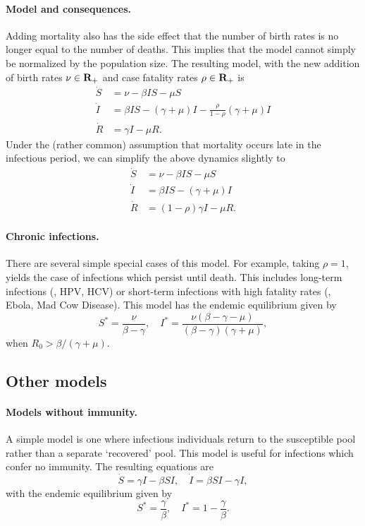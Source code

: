 \documentclass[12pt]{article}
\begin{document}
\paragraph{Model and consequences.} Adding mortality also has the side effect that the number of birth rates is no longer equal to the number of deaths. This implies that the model cannot simply be normalized by the population size. The resulting model, with the new addition of birth rates $\nu \in {\mbox{\bf R}}_+$ and case fatality rates $\rho \in {\mbox{\bf R}}_+$ is
\[
\begin{aligned}
	\dot S &= \nu - \beta IS - \mu S\\
	\dot I &= \beta IS - (\gamma + \mu) I - \frac{\rho}{1 - \rho}(\gamma + \mu) I\\
	\dot R &= \gamma I - \mu R.
\end{aligned}
\]
Under the (rather common) assumption that mortality occurs late in the infectious period, we can simplify the above dynamics slightly to
\[
\begin{aligned}
	\dot S &= \nu - \beta IS - \mu S\\
	\dot I &= \beta IS - (\gamma + \mu) I\\
	\dot R &= (1 - \rho)\gamma I - \mu R.
\end{aligned}
\]

\paragraph{Chronic infections.} There are several simple special cases of this model. For example, taking $\rho = 1$, yields the case of infections which persist until death. This includes long-term infections (\eg, HPV, HCV) or short-term infections with high fatality rates (\eg, Ebola, Mad Cow Disease). This model has the endemic equilibrium given by
\[
S^* = \frac{\nu}{\beta - \gamma}, \quad I^* = \frac{\nu(\beta - \gamma - \mu)}{(\beta - \gamma)(\gamma + \mu)},
\]
when $R_0 > \beta / (\gamma + \mu)$. 

\subsection{Other models}
\paragraph{Models without immunity.} A simple model is one where infectious individuals return to the susceptible pool rather than a separate `recovered' pool. This model is useful for infections which confer no immunity. The resulting equations are
\[
\dot S = \gamma I - \beta SI, \quad \dot I = \beta SI - \gamma I,
\]
with the endemic equilibrium given by
\[
S^* = \frac{\gamma}{\beta}, \quad I^* = 1 - \frac{\gamma}{\beta}.
\]
\end{document}
